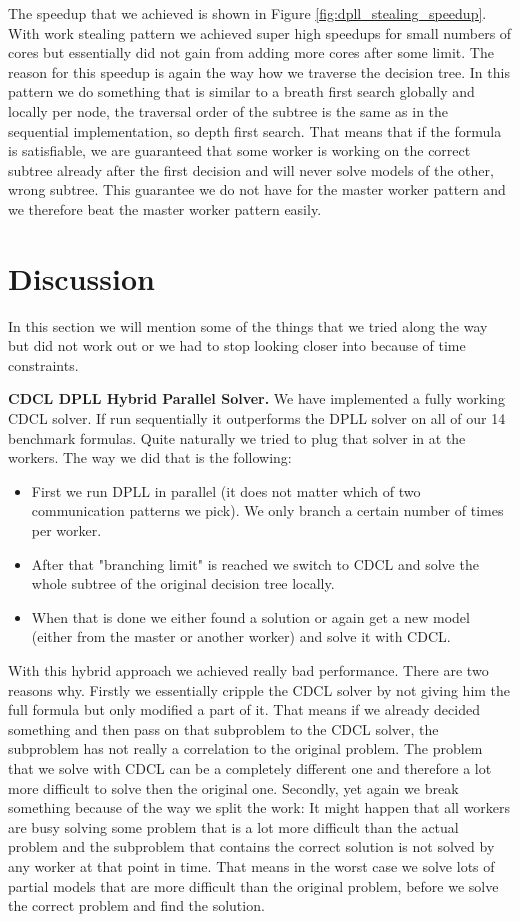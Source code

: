 \documentclass[letterpaper]{article}
\newcommand{\mypar}[1]{{\bf #1.}}
\begin{document}
The speedup that we achieved is shown in Figure \ref{fig:dpll_stealing_speedup}.
With work stealing pattern we achieved super high speedups for small numbers of cores but essentially did not gain from adding more cores after some limit.
The reason for this speedup is again the way how we traverse the decision tree.
In this pattern we do something that is similar to a breath first search globally and locally per node, the traversal order of the subtree is the same as in the sequential implementation, so depth first search.
That means that if the formula is satisfiable, we are guaranteed that some worker is working on the correct subtree already after the first decision and will never solve models of the other, wrong subtree.
This guarantee we do not have for the master worker pattern and we therefore beat the master worker pattern easily.

\section{Discussion}
In this section we will mention some of the things that we tried along the way but did not work out or we had to stop looking closer into because of time constraints.

\mypar{CDCL DPLL Hybrid Parallel Solver}
We have implemented a fully working CDCL solver.
If run sequentially it outperforms the DPLL solver on all of our 14 benchmark formulas.
Quite naturally we tried to plug that solver in at the workers.
The way we did that is the following:
\begin{itemize}
    \item First we run DPLL in parallel (it does not matter which of two communication patterns we pick).
    We only branch a certain number of times per worker.
    \item After that "branching limit" is reached we switch to CDCL and solve the whole subtree of the original decision tree locally.
    \item When that is done we either found a solution or again get a new model (either from the master or another worker) and solve it with CDCL.
\end{itemize}
With this hybrid approach we achieved really bad performance.
There are two reasons why.
Firstly we essentially cripple the CDCL solver by not giving him the full formula but only modified a part of it.
That means if we already decided something and then pass on that subproblem to the CDCL solver, the subproblem has not really a correlation to the original problem.
The problem that we solve with CDCL can be a completely different one and therefore a lot more difficult to solve then the original one.
Secondly, yet again we break something because of the way we split the work:
It might happen that all workers are busy solving some problem that is a lot more difficult than the actual problem and the subproblem that contains the correct solution is not solved by any worker at that point in time.
That means in the worst case we solve lots of partial models that are more difficult than the original problem, before we solve the correct problem and find the solution.
\end{document}
